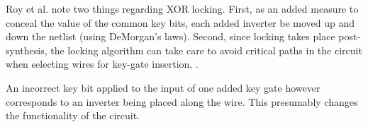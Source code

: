 Roy et al. note two things regarding XOR locking. First, as an added measure to conceal the value of the common key bits, each added inverter be moved up and down the netlist (using DeMorgan's laws). Second, since locking takes place post-synthesis, the locking algorithm can take care to avoid critical paths in the circuit when selecting wires for key-gate insertion, . 

An incorrect key bit applied to the input of one added key gate however corresponds to an inverter being placed along the wire. This presumably changes the functionality of the circuit.


